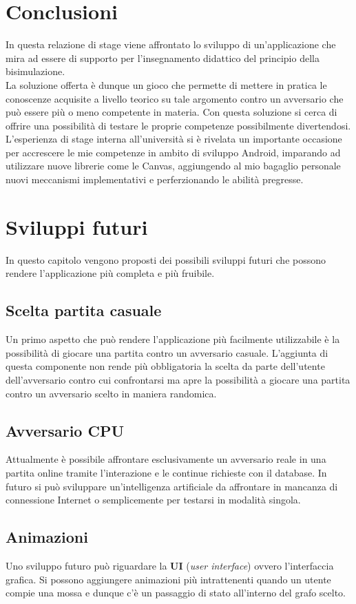 \documentclass[a4paper,12pt,twoside,openright]{report}
\begin{document}
\chapter{Conclusioni}
In questa relazione di stage viene affrontato lo sviluppo di un'applicazione che mira ad essere di supporto per l'insegnamento didattico del principio della bisimulazione.\\
La soluzione offerta è dunque un gioco che permette di mettere in pratica le conoscenze acquisite a livello teorico su tale argomento contro un avversario che può essere più o meno competente in materia. Con questa soluzione si cerca di offrire una possibilità di testare le proprie competenze possibilmente divertendosi.\\
L'esperienza di stage interna all'università si è rivelata un importante occasione per accrescere le mie competenze in ambito di sviluppo Android, imparando ad utilizzare nuove librerie come le Canvas, aggiungendo al mio bagaglio personale nuovi meccanismi implementativi e perferzionando le abilità pregresse.

\chapter{Sviluppi futuri}
In questo capitolo vengono proposti dei possibili sviluppi futuri che possono rendere l'applicazione più completa e più fruibile.

\section{Scelta partita casuale}
Un primo aspetto che può rendere l'applicazione più facilmente utilizzabile è la possibilità di giocare una partita contro un avversario casuale. L'aggiunta di questa componente non rende più obbligatoria la scelta da parte dell'utente dell'avversario contro cui confrontarsi ma apre la possibilità a giocare una partita contro un avversario scelto in maniera randomica.

\section{Avversario CPU}
Attualmente è possibile affrontare esclusivamente un avversario reale in una partita online tramite l'interazione e le continue richieste con il database. In futuro si può sviluppare un'intelligenza artificiale da affrontare in mancanza di connessione Internet o semplicemente per testarsi in modalità singola.

\section{Animazioni}
Uno sviluppo futuro può riguardare la \textbf{UI} (\textit{user interface}) ovvero l'interfaccia grafica. Si possono aggiungere animazioni più intrattenenti quando un utente compie una mossa e dunque c'è un passaggio di stato all'interno del grafo scelto.
\end{document}
